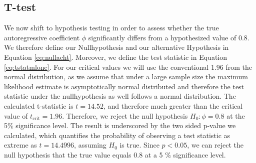 \documentclass[11pt]{article}
\begin{document}
\subsection{T-test}
We now shift to hypothesis testing in order to assess whether the true autoregressive coefficient $\phi$ significantly differs from a hypothesized value of 0.8.
We therefore define our Nullhypothesis and our alternative Hypothesis in Equation \ref{eq:nullacht}.
Moreover, we define the test statistic in Equation \ref{eq:tstatmlone}.
For our critical values we will use the conventional 1.96 from the normal distribution, as we assume that under a large sample size the maximum likelihood estimate is asymptotically normal distributed and therefore the test statistic under the nullhypothesis as well follows a normal distribution. The calculated t-statistic is \( t = 14.52 \), and therefore much greater than the critical value of \( t_{\text{crit}} = 1.96 \). 
Therefore, we  reject the null hypothesis \( H_0: \phi = 0.8 \) at the 5\% significance level.
The result is underscored by the two sided p-value we calculated, which quantifies the probability of observing a test statistic as extreme as \( t = 14.4996 \), assuming \( H_0 \) is true.
Since \( p < 0.05 \), we can reject the null hypothesis that the true value equals 0.8 at a 5 \% significance level. 
\end{document}
